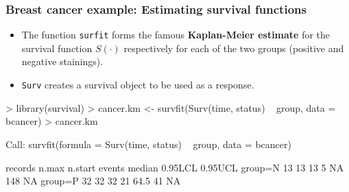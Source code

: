 \documentclass{beamer}
\newcounter{example}
\begin{document}
\begin{frame}[fragile] \frametitle{ Breast cancer example: Estimating survival functions }

\begin{itemize}
\item The function \texttt{surfit} forms the famous {\bf Kaplan-Meier estimate} for the survival function $S(\cdot)$ respectively for each of the two groups (positive and negative stainings).
\item \texttt{Surv} creates a survival object to be used as  a response. 

\end{itemize}


\begin{scriptsize}
\begin{Schunk}
\begin{Sinput}
> library(survival)
> cancer.km <- survfit(Surv(time, status) ~ group, data = bcancer)
> cancer.km
\end{Sinput}
\begin{Soutput}
Call: survfit(formula = Surv(time, status) ~ group, data = bcancer)

        records n.max n.start events median 0.95LCL 0.95UCL
group=N      13    13      13      5     NA     148      NA
group=P      32    32      32     21   64.5      41      NA
\end{Soutput}
\end{Schunk}
\end{scriptsize}
\end{frame}
\end{document}
